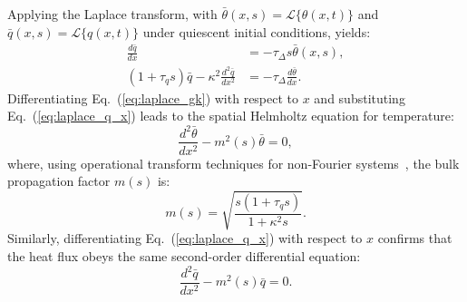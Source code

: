 \documentclass[preprint,12pt]{elsarticle}
\begin{document}
Applying the Laplace transform, with $\bar{\theta}(x, s) = \mathcal{L}\{\theta(x, t)\}$ and $\bar{q}(x, s) = \mathcal{L}\{q(x, t)\}$ under quiescent initial conditions, yields:
\begin{align}
\frac{d\bar{q}}{dx} &= -\tau_\Delta s \bar{\theta}(x, s), \label{eq:laplace_q_x} \\
(1 + \tau_q s)\bar{q} - \kappa^2 \frac{d^2\bar{q}}{dx^2} &= -\tau_\Delta \frac{d\bar{\theta}}{dx}. \label{eq:laplace_gk}
\end{align}
Differentiating Eq.~(\ref{eq:laplace_gk}) with respect to $x$ and substituting Eq.~(\ref{eq:laplace_q_x}) leads to the spatial Helmholtz equation for temperature:
\begin{equation}
\frac{d^2\bar{\theta}}{dx^2} - m^2(s)\bar{\theta} = 0,
\label{eq:helmholtz}
\end{equation}
where, using operational transform techniques for non-Fourier systems~\cite{maillet2000thermal,ramos2023nonnegativity}, the bulk propagation factor $m(s)$ is:
\begin{equation}
m(s) = \sqrt{\frac{s(1 + \tau_q s)}{1 + \kappa^2 s}}.
\label{eq:m_s}
\end{equation}
Similarly, differentiating Eq.~(\ref{eq:laplace_q_x}) with respect to $x$ confirms that the heat flux obeys the same second-order differential equation:
\begin{equation}
\frac{d^2\bar{q}}{dx^2} - m^2(s)\bar{q} = 0.
\label{eq:helmholtz_q}
\end{equation}
\end{document}
